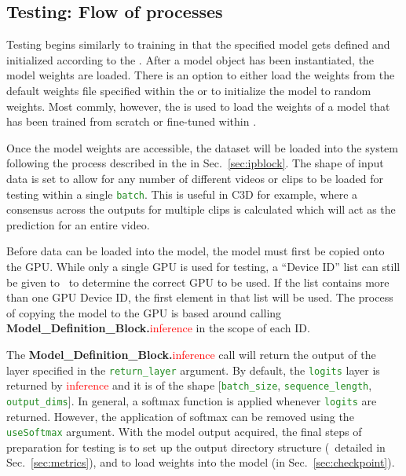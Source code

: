 \documentclass{llncs}
\begin{document}
\subsection{Testing: Flow of processes}
\label{sec:testing}

Testing begins similarly to training in that the specified model gets defined and initialized according to the \modeldef.
After a model object has been instantiated, the model weights are loaded.
There is an option to either load the weights from the default weights file specified within the \modeldef or to initialize the model to random weights.
Most commly, however, the \checkpoint is used to load the weights of a model that has been trained from scratch or fine-tuned within \acro.

Once the model weights are accessible, the dataset will be loaded into the system following the process described in the \data in Sec.~\ref{sec:ipblock}.
The shape of input data is set to allow for any number of different videos or clips to be loaded for testing within a single \texttt{\textcolor{ForestGreen}{batch}}.
This is useful in C3D for example, where a consensus across the outputs for multiple clips is calculated which will act as the prediction for an entire video.

Before data can be loaded into the model, the model must first be copied onto the GPU.
While only a single GPU is used for testing, a ``Device ID'' list can still be given to \acro~to determine the correct GPU to be used.
If the list contains more than one GPU Device ID, the first element in that list will be used.
The process of copying the model to the GPU is based around calling \textbf{Model\_Definition\_Block.}\textcolor{red}{inference} in the scope of each ID.

The \textbf{Model\_Definition\_Block.}\textcolor{red}{inference} call will return the output of the layer specified in the \texttt{\textcolor{ForestGreen}{return\_layer}} argument.
By default, the \texttt{\textcolor{ForestGreen}{logits}} layer is returned by \textcolor{red}{inference} and it is of the shape [\texttt{\textcolor{ForestGreen}{batch\_size}}, \texttt{\textcolor{ForestGreen}{sequence\_length}}, \texttt{\textcolor{ForestGreen}{output\_dims}}].
In general, a softmax function is applied whenever \texttt{\textcolor{ForestGreen}{logits}} are returned.
However, the application of softmax can be removed using the \texttt{\textcolor{ForestGreen}{useSoftmax}} argument.
With the model output acquired, the final steps of preparation for testing is to set up the output directory structure (\metrics~detailed in Sec.~\ref{sec:metrics}), and to load weights into the model (\checkpoint in Sec.~\ref{sec:checkpoint}).
\end{document}
